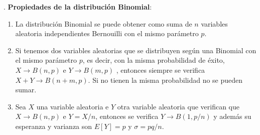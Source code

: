 \vspace{10mm} %

\begin{theorem}
.	\textbf{Propiedades de la distribución Binomial}:

\begin{enumerate}
	\item La distribución Binomial se puede obtener como suma de $n$ variables aleatoria independientes Bernouilli con el mismo parámetro $p$.
	\item Si tenemos dos variables aleatorias que se distribuyen según una Binomial con el mismo parámetro $p$, es decir, con la misma probabilidad de éxito, $X \to  B(n, p) \text{ e }  Y \to  B(m, p)$ , entonces siempre se verifica $X + Y \to  B(n + m, p)$. Si no tienen la misma probabilidad no se pueden sumar.
	\item Sea $X$ una variable aleatoria e $Y$ otra variable aleatoria que verifican que $X \to  B(n, p)$ e $Y=X/n$, entonces se verifica $Y \to  B(1, p / n)$ y además su esperanza y varianza son $E[Y]= p$ y $\sigma= pq/n$.	
\end{enumerate}
\end{theorem}


\vspace{10mm} %

